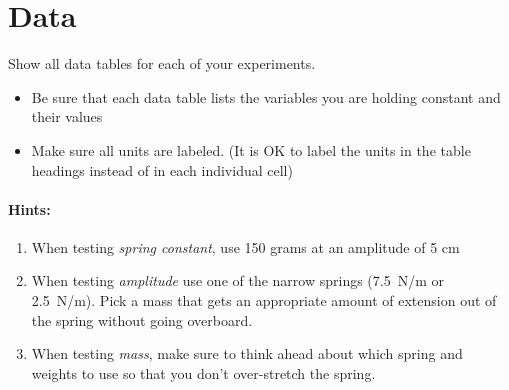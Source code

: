 \documentclass[10pt]{exam}
\begin{document}
  \vs[3]

  \pagebreak


\section*{Data}
  Show all data tables for each of your experiments.

  \begin{itemize}
    \item
      Be sure that each data table lists the variables you are holding constant and their values
    \item
      Make sure all units are labeled. (It is OK to label the units in the table headings instead of in each individual cell)
  \end{itemize}

  \vspace{1em}

  \paragraph{Hints:} \hfill

  \begin{enumerate}
    \item 
      When testing \emph{spring constant}, use 150 grams at an amplitude of 5 cm
    \item 
      When testing \emph{amplitude} use one of the narrow springs (7.5~N/m or 2.5~N/m).   Pick a mass that gets an appropriate amount of extension out of the spring without going overboard.
    \item 
      When testing \emph{mass}, make sure to think ahead about which spring and weights to use so that you don't over-stretch the spring.
    
  \end{enumerate}

  \vspace{4em}


  \newcommand{\datatable}[3]{
    \begin{tabular}{|p{8em}|||c|c|c||c|||p{8em}|}
      \hline
      \multicolumn{6}{|l|}{\bf Experiment\##1: #2} \\\hline
      \multicolumn{6}{|l|}{\bf Constant Variables:} \\[.5em] \hline
      &\multicolumn{4}{l|||}{} & \\[.5em] \cline{2-5} 
      & Trial \#1 & Trial \#2 & Trial \#3 & Average & \\ \hline
      &&&&&\\[.5em] \hline
      &&&&&\\[.5em] \hline
      &&&&&\\[.5em] \hline
      &&&&&\\[.5em] \hline
      &&&&&\\[.5em] \hline

    \end{tabular}

    \vspace{2em}

    
  }
\end{document}
